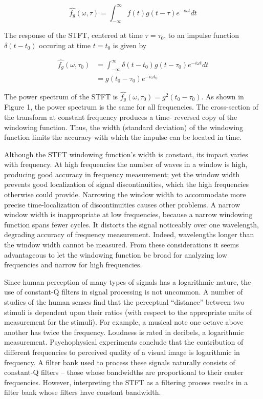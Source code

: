 \documentclass[a4paper,12pt]{article}
\begin{document}
\[
\hat{f_g}(\omega, \tau) = \int_{-\infty}^{\infty}f(t) g(t-\tau) e^{-i \omega t} dt
\]

The response of the STFT, centered at time \(\tau = \tau_0\), to an impulse function \(\delta(t-t_0)\) occuring at time
\(t=t_0\) is given by

\begin{align*}
\hat{f_g}(\omega, \tau_0) &= \int_{-\infty}^{\infty} \delta(t-t_0) g(t-\tau_0) e^{-i \omega t} dt \\
&= g(t_0-\tau_0) e^{-i \omega t_0}
\end{align*}

The power spectrum of the STFT is \(\hat{f_g}(\omega, \tau_0) = g^2(t_0-\tau_0)\). As shown in Figure 1, the power
spectrum is the same for all frequencies.  The cross-section of the transform at constant frequency produces a time-
reversed copy of the windowing function. Thus, the width (standard deviation) of the windowing function limits the
accuracy with which the impulse can be located in time.

Although the STFT windowing function's width is constant, its impact varies with frequency. At high frequencies the
number of waves in a window is high, producing good accuracy in frequency measurement; yet the window width prevents
good localization of signal discontinuities, which the high frequencies otherwise could provide. Narrowing the window
width to accommodate more precise time-localization of discontinuities causes other problems. A narrow window width is
inappropriate at low frequencies, because a narrow windowing function spans fewer cycles. It distorts the signal
noticeably over one wavelength, degrading accuracy of frequency measurement. Indeed, wavelengths longer than the window
width cannot be measured. From these considerations it seems advantageous to let the windowing function be broad for
analyzing low frequencies and narrow for high frequencies.

Since human perception of many types of signals has a logarithmic nature, the use of constant-Q filters in signal
processing is not uncommon. A number of studies of the human senses find that the perceptual ``distance'' between two
stimuli is dependent upon their ratios (with respect to the appropriate units of measurement for the stimuli). For
example, a musical note one octave above another has twice the frequency. Loudness is rated in decibels, a logarithmic
measurement. Psychophysical experiments conclude that the contribution of different frequencies to perceived quality of
a visual image is logarithmic in frequency. A filter bank used to process these signals naturally consists of constant-Q
filters -- those whose bandwidths are proportional to their center frequencies. However, interpreting the
STFT as a filtering process results in a filter bank whose filters have constant bandwidth.
\end{document}
